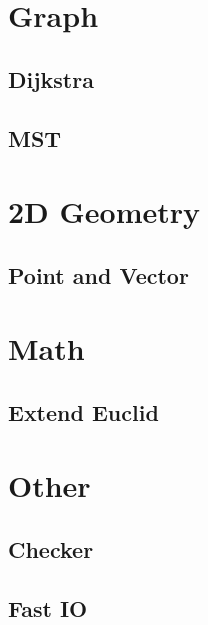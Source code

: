 \documentclass{article}
\begin{document}
	\section{Graph}
		\subsection{Dijkstra}
		\subsection{MST}
	\section{2D Geometry}
		\subsection{Point and Vector}
	\section{Math}
		\subsection{Extend Euclid}
	\section{Other}
		\subsection{Checker}
		\subsection{Fast IO}
			
\end{document}
